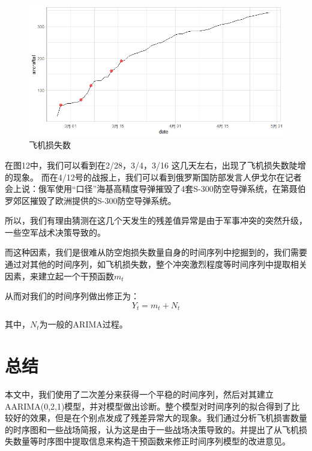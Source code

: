 \documentclass{article}
\begin{document}
		\begin{figure}[H]
		\centering
		\includegraphics[width=.9\textwidth]{Rplot12.png}
		\caption{飞机损失数}
	\end{figure}
	在图12中，我们可以看到在2/28，3/4，3/16 这几天左右，出现了飞机损失数陡增的现象。
	而在4/12号的战报上，我们可以看到俄罗斯国防部发言人伊戈尔在记者会上说：俄军使用“口径”海基高精度导弹摧毁了4套S-300防空导弹系统，在第聂伯罗郊区摧毁了欧洲提供的S-300防空导弹系统。
	
	所以，我们有理由猜测在这几个天发生的残差值异常是由于军事冲突的突然升级，一些空军战术决策导致的。
	
	而这种因素，我们是很难从防空炮损失数量自身的时间序列中挖掘到的，我们需要通过对其他的时间序列，如飞机损失数，整个冲突激烈程度等时间序列中提取相关因素，来建立起一个干预函数$m_t$
	
	从而对我们的时间序列做出修正为：
	\begin{equation}
		Y_t=m_t+N_t
	\end{equation}
	
	
	其中，$N_t$为一般的ARIMA过程。
	
	\section{总结}
	本文中，我们使用了二次差分来获得一个平稳的时间序列，然后对其建立AARIMA(0,2,1)模型，并对模型做出诊断。整个模型对时间序列的拟合得到了比较好的效果，但是在个别点发成了残差异常大的现象。我们通过分析飞机损害数量的时序图和一些战场简报，认为这是由于一些战场决策导致的。并提出了从飞机损失数量等时序图中提取信息来构造干预函数来修正时间序列模型的改进意见。
	
	
	
\end{document}
